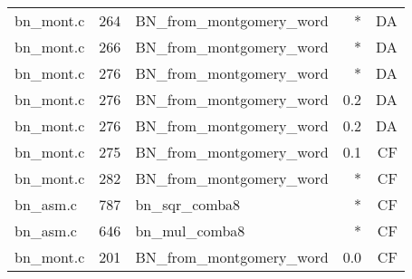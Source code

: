 \begin{table}[h!]
\begin{tabular}{lrlrr}
bn\_mont.c& 264&BN\_from\_montgomery\_word&*&DA\\
bn\_mont.c& 266&BN\_from\_montgomery\_word&*&DA\\
bn\_mont.c& 276&BN\_from\_montgomery\_word&*&DA\\
bn\_mont.c& 276&BN\_from\_montgomery\_word&0.2 &DA\\
bn\_mont.c& 276&BN\_from\_montgomery\_word&0.2 &DA\\
bn\_mont.c& 275&BN\_from\_montgomery\_word&0.1 &CF\\
bn\_mont.c& 282&BN\_from\_montgomery\_word&*&CF\\
bn\_asm.c& 787&bn\_sqr\_comba8&*&CF\\
bn\_asm.c& 646&bn\_mul\_comba8&*&CF\\
bn\_mont.c& 201&BN\_from\_montgomery\_word&0.0 &CF\\
\hline
\end{tabular}
\renewcommand{\baselinestretch}{1.0}\selectfont
\end{table}
